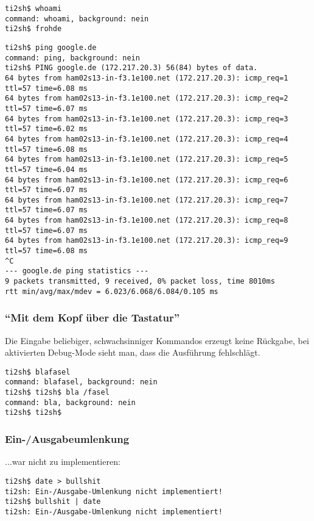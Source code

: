 \begin{lstlisting}[numbers=none]
ti2sh$ whoami
command: whoami, background: nein
ti2sh$ frohde
\end{lstlisting}
\clearpage
\begin{lstlisting}[numbers=none]
ti2sh$ ping google.de
command: ping, background: nein
ti2sh$ PING google.de (172.217.20.3) 56(84) bytes of data.
64 bytes from ham02s13-in-f3.1e100.net (172.217.20.3): icmp_req=1 ttl=57 time=6.08 ms
64 bytes from ham02s13-in-f3.1e100.net (172.217.20.3): icmp_req=2 ttl=57 time=6.07 ms
64 bytes from ham02s13-in-f3.1e100.net (172.217.20.3): icmp_req=3 ttl=57 time=6.02 ms
64 bytes from ham02s13-in-f3.1e100.net (172.217.20.3): icmp_req=4 ttl=57 time=6.08 ms
64 bytes from ham02s13-in-f3.1e100.net (172.217.20.3): icmp_req=5 ttl=57 time=6.04 ms
64 bytes from ham02s13-in-f3.1e100.net (172.217.20.3): icmp_req=6 ttl=57 time=6.07 ms
64 bytes from ham02s13-in-f3.1e100.net (172.217.20.3): icmp_req=7 ttl=57 time=6.07 ms
64 bytes from ham02s13-in-f3.1e100.net (172.217.20.3): icmp_req=8 ttl=57 time=6.07 ms
64 bytes from ham02s13-in-f3.1e100.net (172.217.20.3): icmp_req=9 ttl=57 time=6.08 ms
^C
--- google.de ping statistics ---
9 packets transmitted, 9 received, 0% packet loss, time 8010ms
rtt min/avg/max/mdev = 6.023/6.068/6.084/0.105 ms
\end{lstlisting}



\subsubsection{``Mit dem Kopf über die Tastatur''}
Die Eingabe beliebiger, schwachsinniger Kommandos erzeugt keine Rückgabe, bei aktivierten Debug-Mode sieht man, dass die Ausführung fehlschlägt.
\begin{lstlisting}[numbers=none]
ti2sh$ blafasel
command: blafasel, background: nein
ti2sh$ ti2sh$ bla /fasel
command: bla, background: nein
ti2sh$ ti2sh$
\end{lstlisting}

\subsubsection{Ein-/Ausgabeumlenkung}
...war nicht zu implementieren:
\begin{lstlisting}[numbers=none]
ti2sh$ date > bullshit
ti2sh: Ein-/Ausgabe-Umlenkung nicht implementiert!
ti2sh$ bullshit | date
ti2sh: Ein-/Ausgabe-Umlenkung nicht implementiert!
\end{lstlisting}

